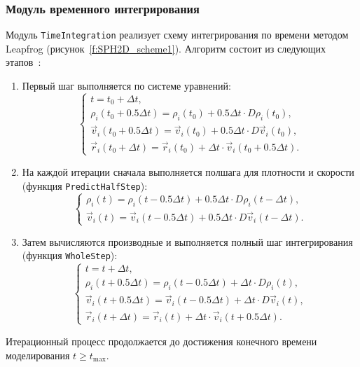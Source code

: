 \subsubsection{Модуль временного интегрирования}

Модуль \verb|TimeIntegration| реализует схему интегрирования по времени методом Leapfrog (рисунок~\ref{f:SPH2D_scheme1}). 
%
Алгоритм состоит из следующих этапов~\cite{Liu2003}:
\begin{enumerate}
    \item Первый шаг выполняется по системе уравнений:
    \begin{equation}\label{eq:leapfrog0}
        \begin{cases}
            t = t_{0} + \Delta t, 
            \\
            \rho_{i}(t_{0} + 0.5 \Delta t) = \rho_{i}(t_{0}) + 0.5 \Delta t \cdot D\rho_{i}(t_{0}),
            \\
            \vec{v}_{i}(t_{0} + 0.5 \Delta t) = \vec{v}_{i}(t_{0}) + 0.5 \Delta t  \cdot D\vec{v}_{i}(t_{0}),
            \\
            \vec{r}_{i}(t_{0} + \Delta t) = \vec{r}_{i}(t_{0}) + \Delta t \cdot \vec{v}_{i}(t_{0}+0.5\Delta t).
        \end{cases} 
    \end{equation}

    \item На каждой итерации сначала выполняется полшага для плотности и скорости (функция \verb|PredictHalfStep|):
    \begin{equation}\label{eq:leapfrog1}
        \begin{cases}
            \rho_{i}(t) = \rho_{i}(t - 0.5 \Delta t) + 0.5 \Delta t \cdot D\rho_{i}(t - \Delta t),
            \\
            \vec{v}_{i}(t) = \vec{v}_{i}(t - 0.5 \Delta t) + 0.5 \Delta t \cdot D\vec{v}_{i}(t - \Delta t).
        \end{cases} 
    \end{equation}

    \item Затем вычисляются производные и выполняется полный шаг интегрирования (функция \verb|WholeStep|):
    \begin{equation}\label{eq:leapfrog2}
        \begin{cases}
            t = t + \Delta t, 
            \\
            \rho_{i}(t + 0.5 \Delta t) = \rho_{i}(t - 0.5 \Delta t) + \Delta t \cdot D\rho_{i}(t),
            \\
            \vec{v}_{i}(t + 0.5 \Delta t) = \vec{v}_{i}(t - 0.5 \Delta t) + \Delta t \cdot D\vec{v}_{i}(t),
            \\
            \vec{r}_{i}(t + \Delta t) = \vec{r}_{i}(t) + \Delta t \cdot \vec{v}_{i}(t+0.5\Delta t).
        \end{cases} 
    \end{equation}
\end{enumerate}
%
Итерационный процесс продолжается до достижения конечного времени моделирования $t \geq t_{\text{max}}$.

